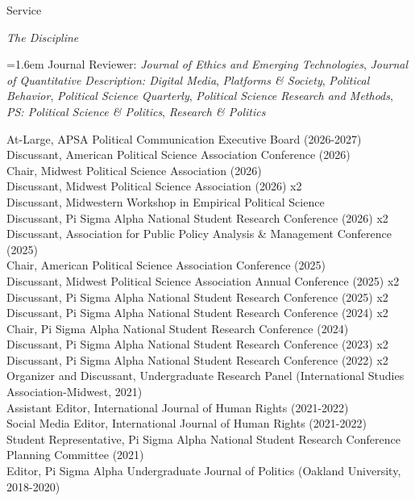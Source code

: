 \documentclass{resume} %
\begin{document}
\begin{rSection}{Service}

{\it The Discipline} 
\par\hangindent=1.6em
Journal Reviewer: \textit{Journal of Ethics and Emerging Technologies}, \textit{Journal of Quantitative Description: Digital Media}, \textit{Platforms \& Society}, \textit{Political Behavior}, \textit{Political Science Quarterly}, \textit{Political Science Research and Methods}, \textit{PS: Political Science \& Politics}, \textit{Research \& Politics}\par
At-Large, APSA Political Communication Executive Board (2026-2027)
\\Discussant, American Political Science Association Conference (2026)
\\Chair, Midwest Political Science Association (2026)
\\Discussant, Midwest Political Science Association (2026) x2
\\Discussant, Midwestern Workshop in Empirical Political Science
\\Discussant, Pi Sigma Alpha National Student Research Conference (2026) x2
\\Discussant, Association for Public Policy Analysis \& Management Conference (2025)
\\Chair, American Political Science Association Conference (2025)
\\Discussant, Midwest Political Science Association Annual Conference (2025) x2
\\Discussant, Pi Sigma Alpha National Student Research Conference (2025) x2
\\Discussant, Pi Sigma Alpha National Student Research Conference (2024) x2
\\Chair, Pi Sigma Alpha National Student Research Conference (2024)
\\Discussant, Pi Sigma Alpha National Student Research Conference (2023) x2
\\Discussant, Pi Sigma Alpha National Student Research Conference (2022) x2
\\Organizer and Discussant, Undergraduate Research Panel (International Studies Association-Midwest, 2021)
\\Assistant Editor, International Journal of Human Rights (2021-2022)
\\Social Media Editor, International Journal of Human Rights (2021-2022)
\\Student Representative, Pi Sigma Alpha National Student Research Conference Planning Committee (2021)
\\Editor, Pi Sigma Alpha Undergraduate Journal of Politics (Oakland University, 2018-2020)


\end{rSection}
\end{document}

